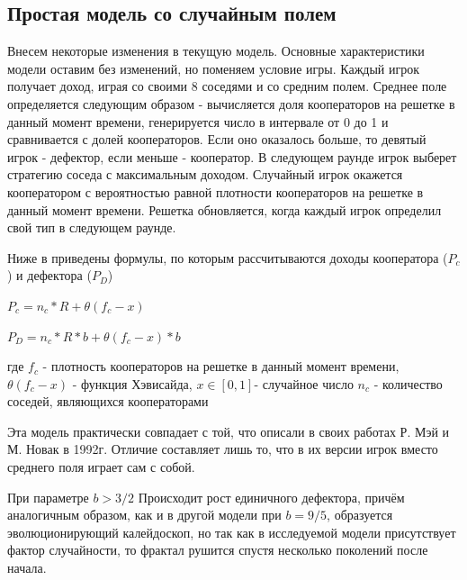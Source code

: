 \documentclass[a4paper]{article}
\begin{document}
	
	\subsection{Простая модель со случайным полем}
	
	\par Внесем некоторые изменения в текущую модель. Основные характеристики модели
	оставим без изменений, но поменяем условие игры. Каждый игрок получает доход, играя со своими 8 соседями и со средним полем. Среднее поле определяется следующим образом - вычисляется доля кооператоров на решетке в данный момент времени, генерируется число в интервале от 0 до 1 и сравнивается с долей кооператоров. Если оно оказалось больше, то девятый игрок - дефектор, если меньше - кооператор. В следующем раунде игрок выберет стратегию соседа с максимальным доходом. Случайный игрок окажется кооператором с вероятностью равной плотности кооператоров на решетке в данный момент времени. Решетка 
	обновляется, когда каждый игрок определил свой тип в следующем раунде.
	
	\par Ниже в приведены формулы, по которым рассчитываются доходы кооператора ($P_{c}$) и дефектора ($P_{D}$)
	
	$ P_{c}= n_{c}*R+ \theta(f_{c}-x) $
	
	$ P_{D}= n_{c}*R*b+ \theta(f_{c}-x)*b $
	
	где $ f_{c}$ - плотность кооператоров на решетке в данный момент
	времени, $\theta(f_{c}-x)$ - функция Хэвисайда, $x \in [0,1]$- случайное число
	$n_{c}$ - количество соседей, являющихся кооператорами
	 
	
	\par Эта модель практически совпадает с той, что описали в своих работах Р. Мэй и
	М. Новак в 1992г. Отличие составляет лишь то, что в их версии игрок вместо среднего поля играет сам с собой.
	
	\par При параметре $b>3/2$ Происходит рост единичного дефектора, причём аналогичным образом, как и в другой модели при $b=9/5$, образуется эволюционирующий калейдоскоп, но так как в исследуемой модели присутствует фактор случайности, то фрактал рушится спустя несколько поколений после начала.
	
\end{document}
